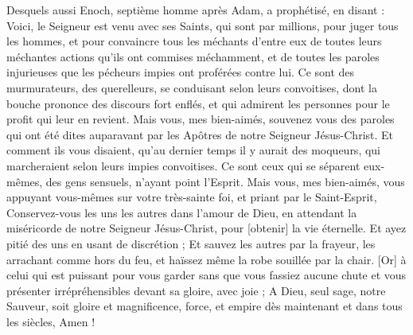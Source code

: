 \begin{multicols}{2}
Desquels aussi Enoch, septième homme après Adam, a prophétisé, en disant :
Voici, le Seigneur est venu avec ses Saints, qui sont par millions, pour juger tous les hommes, et pour convaincre tous les méchants d'entre eux de toutes leurs méchantes actions qu'ils ont commises méchamment, et de toutes les paroles injurieuses que les pécheurs impies ont proférées contre lui.
Ce sont des murmurateurs, des querelleurs, se conduisant selon leurs convoitises, dont la bouche prononce des discours fort enflés, et qui admirent les personnes pour le profit qui leur en revient.
Mais vous, mes bien-aimés, souvenez vous des paroles qui ont été dites auparavant par les Apôtres de notre Seigneur Jésus-Christ.
Et comment ils vous disaient, qu'au dernier temps il y aurait des moqueurs, qui marcheraient selon leurs impies convoitises.
Ce sont ceux qui se séparent eux-mêmes, des gens sensuels, n'ayant point l'Esprit.
Mais vous, mes bien-aimés, vous appuyant vous-mêmes sur votre très-sainte foi, et priant par le Saint-Esprit,
Conservez-vous les uns les autres dans l'amour de Dieu, en attendant la miséricorde de notre Seigneur Jésus-Christ, pour [obtenir] la vie éternelle.
Et ayez pitié des uns en usant de discrétion ;
Et sauvez les autres par la frayeur, les arrachant comme hors du feu, et haïssez même la robe souillée par la chair.
[Or] à celui qui est puissant pour vous garder sans que vous fassiez aucune chute et vous présenter irrépréhensibles devant sa gloire, avec joie ;
A Dieu, seul sage, notre Sauveur, soit gloire et magnificence, force, et empire dès maintenant et dans tous les siècles, Amen !
\PPE{}
\end{multicols}
